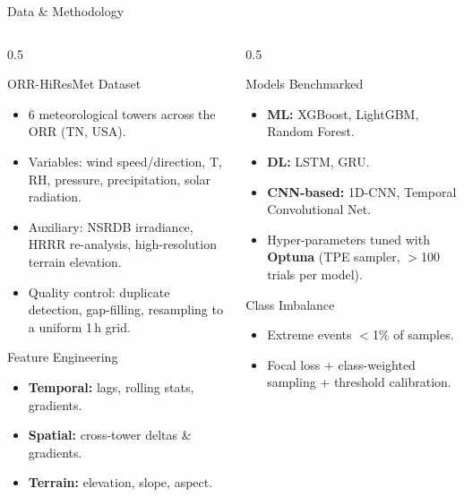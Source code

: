 \documentclass[aspectratio=169,10pt]{beamer}
\begin{document}
\begin{frame}{Data \& Methodology}
\begin{columns}[T]
  \begin{column}{0.5\textwidth}
    \begin{block}{ORR-HiResMet Dataset}
      \begin{itemize}
        \item 6 meteorological towers across the ORR (TN, USA).
        \item Variables: wind speed/direction, T, RH, pressure,
              precipitation, solar radiation.
        \item Auxiliary: NSRDB irradiance, HRRR re-analysis,
              high-resolution terrain elevation.
        \item Quality control: duplicate detection, gap-filling,
              resampling to a uniform 1\,h grid.
      \end{itemize}
    \end{block}
    \begin{block}{Feature Engineering}
      \begin{itemize}
        \item \textbf{Temporal:} lags, rolling stats, gradients.
        \item \textbf{Spatial:} cross-tower deltas \& gradients.
        \item \textbf{Terrain:} elevation, slope, aspect.
      \end{itemize}
    \end{block}
  \end{column}

  \begin{column}{0.5\textwidth}
    \begin{block}{Models Benchmarked}
      \begin{itemize}
        \item \textbf{ML:} XGBoost, LightGBM, Random Forest.
        \item \textbf{DL:} LSTM, GRU.
        \item \textbf{CNN-based:} 1D-CNN, Temporal Convolutional Net.
        \item Hyper-parameters tuned with \textbf{Optuna}
              (TPE sampler, $>$100 trials per model).
      \end{itemize}
    \end{block}
    \begin{block}{Class Imbalance}
      \begin{itemize}
        \item Extreme events $<$1\% of samples.
        \item Focal loss + class-weighted sampling
              + threshold calibration.
      \end{itemize}
    \end{block}
  \end{column}
\end{columns}
\end{frame}
\end{document}
